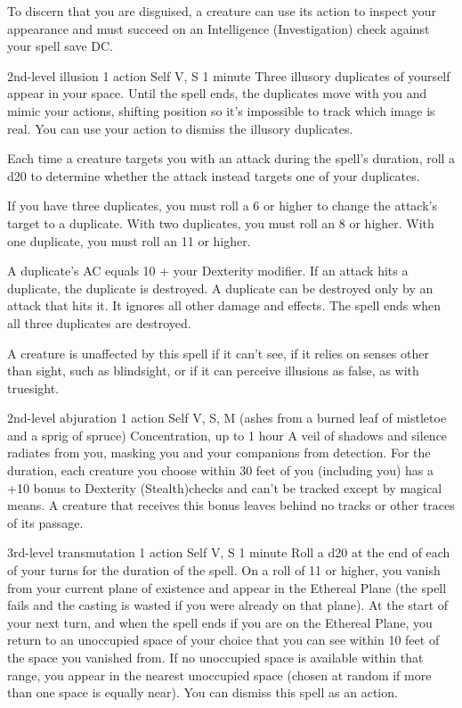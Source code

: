\documentclass[10pt,twoside,twocolumn,openany]{book}
\begin{document}
To discern that you are disguised, a creature can use its action to inspect your appearance and must succeed on an Intelligence (Investigation) check against your spell save DC.

{2nd-level illusion}
{\color{action} 1 action}
{Self}
{V, S}
{1 minute}
%
Three illusory duplicates of yourself appear in your space. Until the spell ends, the duplicates move with you and mimic your actions, shifting position so it's impossible to track which image is real. You can use your action to dismiss the illusory duplicates.

Each time a creature targets you with an attack during the spell's duration, roll a d20 to determine whether the attack instead targets one of your duplicates.

If you have three duplicates, you must roll a 6 or higher to change the attack's target to a duplicate. With two duplicates, you must roll an 8 or higher. With one duplicate, you must roll an 11 or higher.

A duplicate's AC equals 10 + your Dexterity modifier. If an attack hits a duplicate, the duplicate is destroyed. A duplicate can be destroyed only by an attack that hits it. It ignores all other damage and effects. The spell ends when all three duplicates are destroyed.

A creature is unaffected by this spell if it can't see, if it relies on senses other than sight, such as blindsight, or if it can perceive illusions as false, as with truesight.

{2nd-level abjuration}
{\color{action} 1 action}
{Self}
{V, S, M (ashes from a burned leaf of
mistletoe and a sprig of spruce)}
{{\color{concentration}Concentration}, up to 1 hour}
%
A veil of shadows and silence radiates from you, masking you and your companions from detection. For the duration, each creature you choose within 30 feet of you (including you) has a +10 bonus to Dexterity (Stealth)checks and can't be tracked except by magical means. A creature that receives this bonus leaves behind no tracks or other traces of its passage.

{3rd-level transmutation}
{\color{action} 1 action}
{Self}
{V, S}
{1 minute}
%
Roll a d20 at the end of each of your turns for the duration of the spell. On a roll of 11 or higher, you vanish from your current plane of existence and appear in the Ethereal Plane (the spell fails and the casting is wasted if you were already on that plane). At the start of your next turn, and when the spell ends if you are on the Ethereal Plane, you return to an unoccupied space of your choice that you can see within 10 feet of the space you vanished from. If no unoccupied space is available within that range, you appear in the nearest unoccupied space (chosen at random if more than one space is equally near). You can dismiss this spell as an action.
\end{document}
